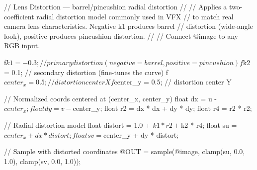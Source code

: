 // Lens Distortion — barrel/pincushion radial distortion
//
// Applies a two-coefficient radial distortion model commonly used in VFX
// to match real camera lens characteristics. Negative k1 produces barrel
// distortion (wide-angle look), positive produces pincushion distortion.
//
// Connect @image to any RGB input.

f$k1 = -0.3;      // primary distortion (negative = barrel, positive = pincushion)
f$k2 = 0.1;       // secondary distortion (fine-tunes the curve)
f$center_x = 0.5; // distortion center X
f$center_y = 0.5; // distortion center Y

// Normalized coords centered at (center_x, center_y)
float dx = u - $center_x;
float dy = v - $center_y;
float r2 = dx * dx + dy * dy;
float r4 = r2 * r2;

// Radial distortion model
float distort = 1.0 + $k1 * r2 + $k2 * r4;
float su = $center_x + dx * distort;
float sv = $center_y + dy * distort;

// Sample with distorted coordinates
@OUT = sample(@image, clamp(su, 0.0, 1.0), clamp(sv, 0.0, 1.0));